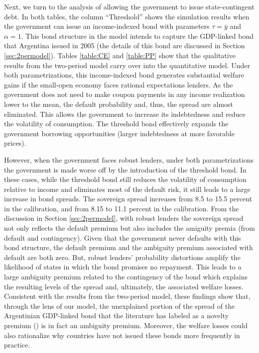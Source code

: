 Next, we turn to the analysis of allowing the government to issue state-contingent debt. In both tables, the column ``Threshold'' shows the simulation results when the government can issue an income-indexed bond with parameters $\tau = \bar{y}$ and $\alpha = 1$. This bond structure in the model intends to capture the GDP-linked bond that Argentina issued in 2005 (the details of this bond are discussed in Section \ref{sec:2permodel}). Tables \ref{table:CE} and \ref{table:PP} show that the qualitative results from the two-period model carry over into the quantitative model. Under both parametrizations, this income-indexed bond generates substantial welfare gains if the small-open economy faces rational expectations lenders. As the government does not need to make coupon payments in any income realization lower to the mean, the default probability and, thus, the spread are almost eliminated. This allows the government to increase its indebtedness and reduce the volatility of consumption. The threshold bond effectively expands the government borrowing opportunities (larger indebtedness at more favorable prices).

However, when the government faces robust lenders, under both parametrizations the government is made worse off by the introduction of the threshold bond. In these cases, while the threshold bond still reduces the volatility of consumption relative to income and eliminates most of the default risk, it still leads to a large increase in bond spreads. The sovereign spread increases from 8.5 to 15.5 percent in the \cite{Chatty} calibration, and from 8.15 to 11.1 percent in the \cite{PouzoPresno2016} calibration. From the discussion in Section \ref{sec:2permodel}, with robust lenders the sovereign spread not only reflects the default premium but also includes the amiguity premia (from default and contingency). Given that the government never defaults with this bond structure, the default premium and the ambiguity premium associated with default are both zero. But, robust lenders' probability distortions amplify the likelihood of states in which the bond promises no repayment. This leads to a large ambiguity premium related to the contingency of the bond which explains the resulting levels of the spread and, ultimately, the associated welfare losses. Consistent with the results from the two-period model, these findings show that, through the lens of our model, the unexplained portion of the spread of the Argentinian GDP-linked bond that the literature has labeled as a novelty premium (\citealp*{ChamonCostaRicci2008}) is in fact an ambiguity premium. Moreover, the welfare losses could also rationalize why countries have not issued these bonds more frequently in practice.

